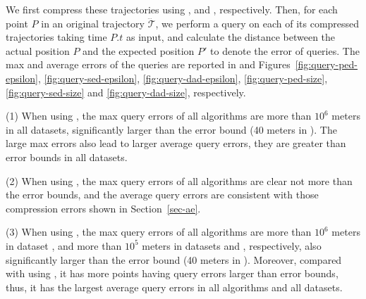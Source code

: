 {We first compress these trajectories using \ped, \sed and \dad, respectively. }
{Then, for each point $P$ in an original trajectory $\dddot{\mathcal{T}}$, we perform a query on each of its compressed trajectories taking time $P.t$ as input, and calculate the distance between the actual position $P$ and the expected position $P'$ to denote the error of queries.
}
%
{The max and average errors of the queries are reported in  and Figures~\ref{fig:query-ped-epsilon}, \ref{fig:query-sed-epsilon}, \ref{fig:query-dad-epsilon}, \ref{fig:query-ped-size},\ref{fig:query-sed-size} and \ref{fig:query-dad-size}, respectively.}


\ni (1) When using \ped, the max query errors of all algorithms are more than $10^6$ meters in all datasets, significantly larger than the error bound (40 meters in ). The large max errors also lead to larger average query errors, \ie they are greater than error bounds in all datasets.


\ni (2) When using \sed, the max query errors of all algorithms are clear not more than the error bounds, and the average query errors are consistent with those compression errors shown in Section~\ref{sec-ae}.


\ni (3) When using \dad, the max query errors of all algorithms are more than $10^6$ meters in dataset \ucar, and more than $10^5$ meters in datasets \geolife and \mopsi, respectively, also significantly larger than the error bound (40 meters in ). Moreover, compared with using \ped, it has more points having query errors larger than error bounds, thus, it has the largest average query errors in all algorithms and all datasets.


